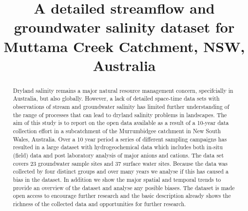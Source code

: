 \documentclass[, manuscript]{copernicus}
\begin{document}
\title{A detailed streamflow and groundwater salinity dataset for
Muttama Creek Catchment, NSW, Australia}











\received{}
\pubdiscuss{} %
\revised{}
\accepted{}
\published{}




\maketitle


\begin{abstract}
Dryland salinity remains a major natural resource management concern,
specifcially in Australia, but also globally. However, a lack of
detailed space-time data sets with observations of stream and
groundwater salinity has limited further understanding of the range of
processes that can lead to dryland salinity problems in landscapes. The
aim of this study is to report on the open data available as a result of
a 10-year data collection effort in a subcatchment of the Murrumbidgee
catchment in New South Wales, Australia. Over a 10 year period a series
of different sampling campaigns has resulted in a large dataset with
hydrogeochemical data which includes both in-situ (field) data and post
laboratory analysis of major anions and cations. The data set covers 23
groundwater sample sites and 37 surface water sites. Because the data
was collected by four distinct groups and over many years we analyse if
this has caused a bias in the dataset. In addition we show the major
spatial and temporal trends to provide an overview of the dataset and
analyse any posible biases. The dataset is made open access to encourage
further research and the basic description already shows the richness of
the collected data and opportunities for further research.
\end{abstract}
\end{document}
